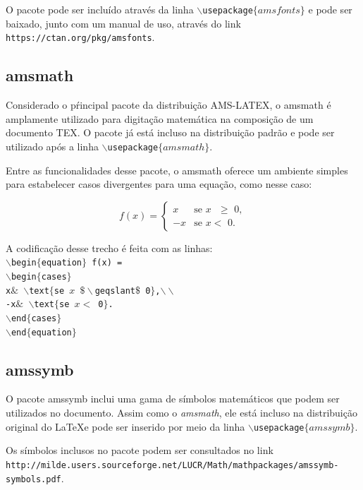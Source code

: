 \documentclass[12pt]{article}
\begin{document}
			O pacote pode ser incluído através da linha \texttt{$\backslash$usepackage$\{amsfonts\}$} e pode ser baixado, junto com um manual de uso, através do link \texttt{https://ctan.org/pkg/amsfonts}.
		
		\subsection{amsmath}
			Considerado o pŕincipal pacote da distribuição AMS-LATEX, o amsmath é amplamente utilizado para digitação matemática na composição de um documento TEX. O pacote já está incluso na distribuição padrão e pode ser utilizado após a linha \texttt{$\backslash$usepackage$\{amsmath\}$}.
			
			Entre as funcionalidades desse pacote, o amsmath oferece um ambiente simples para estabelecer casos divergentes para uma equação, como nesse caso:
			
			\begin{equation} f(x) =
				\begin{cases}
					x& \text{se $x$ $\geqslant$ 0},\\
					-x& \text{se $x <$  0}.
				\end{cases}
			\end{equation}
			
			A codificação desse trecho é feita com as linhas:\\
			\texttt{$\backslash$begin$\{$equation$\}$ f(x) =}\\
			\texttt{$\backslash$begin$\{$cases$\}$}\\
			\texttt{x$\&$ $\backslash$text$\{$se $x$ $\$\backslash$geqslant$\$$  0$\}$,$\backslash\backslash$}\\
			\texttt{-x$\&$ $\backslash$text$\{$se $x <$  0$\}$.}\\
			\texttt{$\backslash$end$\{$cases$\}$}\\
			\texttt{$\backslash$end$\{$equation$\}$}
		
		\subsection{amssymb}
			O pacote amssymb inclui uma gama de símbolos matemáticos que podem ser utilizados no documento. Assim como o \textit{amsmath}, ele está incluso na distribuição original do \LaTeX e pode ser inserido por meio da linha \texttt{$\backslash$usepackage$\{amssymb\}$}.
			
			Os símbolos inclusos no pacote podem ser consultados no link\\ \texttt{http://milde.users.sourceforge.net/LUCR/Math/mathpackages/amssymb-symbols.pdf}.
			
\end{document}
